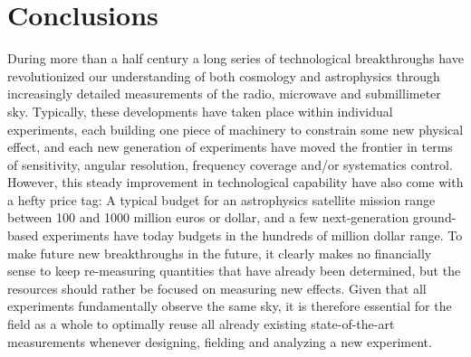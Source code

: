 \documentclass[twocolumn]{../../common/aa}
\def\WMAP{\emph{WMAP}}
\begin{document}


\section{Conclusions}
\label{sec:conclusions}

During more than a half century a long series of technological breakthroughs have revolutionized our understanding of both cosmology and astrophysics through increasingly detailed measurements of the radio, microwave and submillimeter sky. Typically, these developments have taken place within individual experiments, each building one piece of machinery to constrain some new physical effect, and each new generation of experiments have moved the frontier in terms of sensitivity, angular resolution, frequency coverage and/or systematics control. However, this steady improvement in technological capability have also come with a hefty price tag: A typical budget for an astrophysics satellite mission range between 100 and 1000 million euros or dollar, and a few next-generation ground-based experiments have today budgets in the hundreds of million dollar range. To make future new breakthroughs in the future, it clearly makes no financially sense to keep re-measuring quantities that have already been determined, but the resources should rather be focused on measuring new effects. Given that all experiments fundamentally observe the same sky, it is therefore essential for the field as a whole to optimally reuse all already existing state-of-the-art measurements whenever designing, fielding and analyzing a new experiment.
\end{document}
